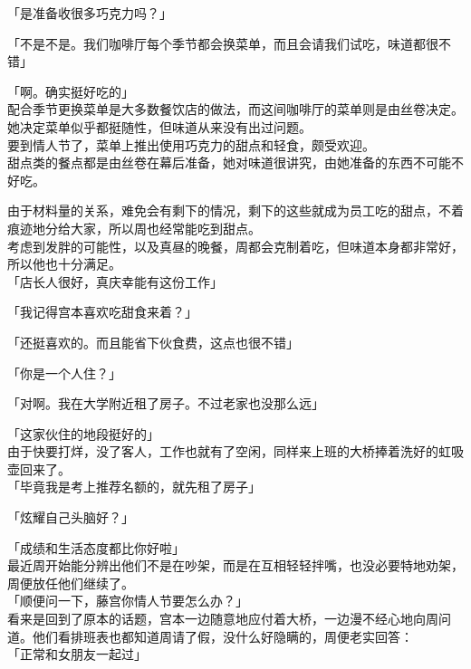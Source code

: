「是准备收很多巧克力吗？」

「不是不是。我们咖啡厅每个季节都会换菜单，而且会请我们试吃，味道都很不错」

「啊。确实挺好吃的」\\

配合季节更换菜单是大多数餐饮店的做法，而这间咖啡厅的菜单则是由丝卷决定。她决定菜单似乎都挺随性，但味道从来没有出过问题。\\

要到情人节了，菜单上推出使用巧克力的甜点和轻食，颇受欢迎。\\

甜点类的餐点都是由丝卷在幕后准备，她对味道很讲究，由她准备的东西不可能不好吃。

由于材料量的关系，难免会有剩下的情况，剩下的这些就成为员工吃的甜点，不着痕迹地分给大家，所以周也经常能吃到甜点。\\

考虑到发胖的可能性，以及真昼的晚餐，周都会克制着吃，但味道本身都非常好，所以他也十分满足。\\

「店长人很好，真庆幸能有这份工作」

「我记得宫本喜欢吃甜食来着？」

「还挺喜欢的。而且能省下伙食费，这点也很不错」

「你是一个人住？」

「对啊。我在大学附近租了房子。不过老家也没那么远」

「这家伙住的地段挺好的」\\

由于快要打烊，没了客人，工作也就有了空闲，同样来上班的大桥捧着洗好的虹吸壶回来了。\\

「毕竟我是考上推荐名额的，就先租了房子」

「炫耀自己头脑好？」

「成绩和生活态度都比你好啦」\\

最近周开始能分辨出他们不是在吵架，而是在互相轻轻拌嘴，也没必要特地劝架，周便放任他们继续了。\\

「顺便问一下，藤宫你情人节要怎么办？」\\

看来是回到了原本的话题，宫本一边随意地应付着大桥，一边漫不经心地向周问道。他们看排班表也都知道周请了假，没什么好隐瞒的，周便老实回答：\\

「正常和女朋友一起过」


